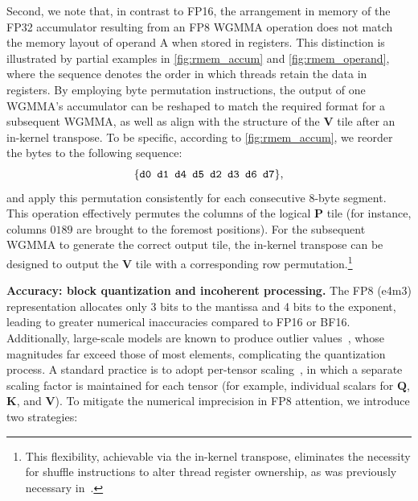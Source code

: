 Second, we note that, in contrast to FP16, the arrangement in memory of the FP32 accumulator resulting from an FP8 WGMMA operation does not match the memory layout of operand A when stored in registers. This distinction is illustrated by partial examples in \cref{fig:rmem_accum} and \cref{fig:rmem_operand}, where the sequence denotes the order in which threads retain the data in registers. By employing byte permutation instructions, the output of one WGMMA's accumulator can be reshaped to match the required format for a subsequent WGMMA, as well as align with the structure of the $\mathbf{V}$ tile after an in-kernel transpose. To be specific, according to \cref{fig:rmem_accum}, we reorder the bytes to the following sequence:
$$\{ \verb|d0 d1 d4 d5 d2 d3 d6 d7| \},$$
and apply this permutation consistently for each consecutive 8-byte segment. This operation effectively permutes the columns of the logical $\mathbf{P}$ tile (for instance, columns $0189$ are brought to the foremost positions). For the subsequent WGMMA to generate the correct output tile, the in-kernel transpose can be designed to output the $\mathbf{V}$ tile with a corresponding row permutation.\footnote{This flexibility, achievable via the in-kernel transpose, eliminates the necessity for shuffle instructions to alter thread register ownership, as was previously necessary in~\citep{colfax_fp8_flashattention_2024}.}

\textbf{Accuracy: block quantization and incoherent processing.} The FP8 (e4m3) representation allocates only 3 bits to the mantissa and 4 bits to the exponent, leading to greater numerical inaccuracies compared to FP16 or BF16. Additionally, large-scale models are known to produce outlier values~\citep{dettmers2208llm, sun2024massive}, whose magnitudes far exceed those of most elements, complicating the quantization process. A standard practice is to adopt per-tensor scaling~\citep{micikevicius2022fp8}, in which a separate scaling factor is maintained for each tensor (for example, individual scalars for $\mathbf{Q}$, $\mathbf{K}$, and $\mathbf{V}$).
To mitigate the numerical imprecision in FP8 attention, we introduce two strategies:

